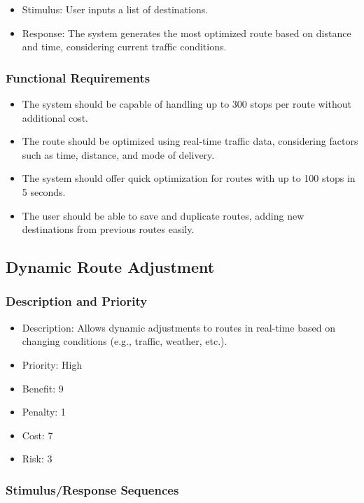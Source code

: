 \begin{itemize}
    \item Stimulus: User inputs a list of destinations.
    \item Response: The system generates the most optimized route based on distance and time, considering current traffic conditions.
\end{itemize}

\subsubsection{Functional Requirements}

\begin{itemize}
    \item The system should be capable of handling up to 300 stops per route without additional cost.
    \item The route should be optimized using real-time traffic data, considering factors such as time, distance, and mode of delivery.
    \item The system should offer quick optimization for routes with up to 100 stops in 5 seconds.
    \item The user should be able to save and duplicate routes, adding new destinations from previous routes easily.
\end{itemize}
	
\subsection{Dynamic Route Adjustment}
\subsubsection{Description and Priority}

\begin{itemize}
    \item Description: Allows dynamic adjustments to routes in real-time based on changing conditions (e.g., traffic, weather, etc.).
    \item Priority: High
    \item Benefit: 9
    \item Penalty: 1
    \item Cost: 7
    \item Risk: 3
\end{itemize}

\subsubsection{Stimulus/Response Sequences}

